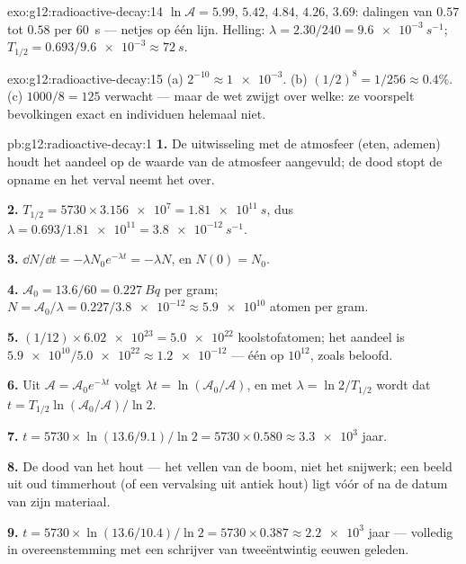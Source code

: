 \begin{solution}{exo:g12:radioactive-decay:14}
$\ln \mathcal A = 5.99$, $5.42$, $4.84$, $4.26$, $3.69$: dalingen van $0.57$
tot $0.58$ per \qty{60}{s} --- netjes op één lijn. Helling:
$\lambda = 2.30/240 = \qty{9.6e-3}{s^{-1}}$;
$T_{1/2} = 0.693/\num{9.6e-3} \approx \qty{72}{s}$.
\end{solution}

\begin{solution}{exo:g12:radioactive-decay:15}
(a) $2^{-10} \approx \num{1e-3}$. (b) $(1/2)^8 = 1/256 \approx 0.4\%$.
(c) $1000/8 = 125$ verwacht --- maar de wet zwijgt over welke: ze voorspelt
bevolkingen exact en individuen helemaal niet.
\end{solution}

\begin{solution}{pb:g12:radioactive-decay:1}
\textbf{1.} De uitwisseling met de atmosfeer (eten, ademen) houdt het aandeel
op de waarde van de atmosfeer aangevuld; de dood stopt de opname en het verval
neemt het over.

\textbf{2.} $T_{1/2} = \num{5730} \times \num{3.156e7} = \qty{1.81e11}{s}$,
dus $\lambda = 0.693/\num{1.81e11} = \qty{3.8e-12}{s^{-1}}$.

\textbf{3.} $\dd N/\dd t = -\lambda N_0 e^{-\lambda t} = -\lambda N$, en
$N(0) = N_0$.

\textbf{4.} $\mathcal A_0 = 13.6/60 = \qty{0.227}{Bq}$ per gram;
$N = \mathcal A_0/\lambda = 0.227/\num{3.8e-12} \approx \num{5.9e10}$ atomen
per gram.

\textbf{5.} $(1/12) \times \num{6.02e23} = \num{5.0e22}$ koolstofatomen; het
aandeel is $\num{5.9e10}/\num{5.0e22} \approx \num{1.2e-12}$ --- één op
$10^{12}$, zoals beloofd.

\textbf{6.} Uit $\mathcal A = \mathcal A_0 e^{-\lambda t}$ volgt
$\lambda t = \ln(\mathcal A_0/\mathcal A)$, en met $\lambda = \ln 2/T_{1/2}$
wordt dat $t = T_{1/2}\ln(\mathcal A_0/\mathcal A)/\ln 2$.

\textbf{7.} $t = \num{5730} \times \ln(13.6/9.1)/\ln 2 =
\num{5730} \times 0.580 \approx \num{3.3e3}$ jaar.

\textbf{8.} De dood van het hout --- het vellen van de boom, niet het
snijwerk; een beeld uit oud timmerhout (of een vervalsing uit antiek hout)
ligt vóór of na de datum van zijn materiaal.

\textbf{9.} $t = \num{5730} \times \ln(13.6/10.4)/\ln 2 =
\num{5730} \times 0.387 \approx \num{2.2e3}$ jaar --- volledig in
overeenstemming met een schrijver van tweeëntwintig eeuwen geleden.


\end{solution}
